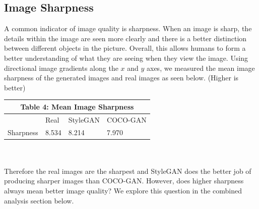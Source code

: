 \documentclass[10pt]{article}
\begin{document}
\begin{multicols*}{2}
        \subsection{Image Sharpness}
        \label{subsec:imageSharpness}
        A common indicator of image quality is sharpness.
        When an image is sharp, the details within the image are seen more clearly and there is a better distinction between different objects in the picture.
        Overall, this allows humans to form a better understanding of what they are seeing when they view the image.
        Using directional image gradients along the $x$ and $y$ axes, we measured the mean image sharpness of the generated images and real images as seen below. (Higher is better)\\

        \begin{tabular}{ |p{2cm}|p{2cm}|p{2cm}|p{2cm}|  }
             \hline
             \multicolumn{4}{|c|}{Table 4: \textbf{Mean Image Sharpness}} \\
             \hline
            & Real & StyleGAN & COCO-GAN  \\
            \hline
            Sharpness & 8.534    & 8.214      & 7.970\\
            \hline
        \end{tabular}
        \\\\
        Therefore the real images are the sharpest and StyleGAN does the better job of producing sharper images than COCO-GAN.
        However, does higher sharpness always mean better image quality?
        We explore this question in the combined analysis section below.


\end{multicols*}
\end{document}
